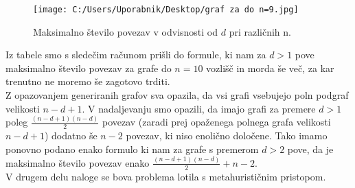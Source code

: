 \documentclass[12pt,a4paper]{amsart}
\theoremstyle{definition} %
\theoremstyle{plain} %
\begin{document}
\begin{figure}[h]
    \centering
    \texttt{[image: C:/Users/Uporabnik/Desktop/graf za do n=9.jpg]}
    \caption{Maksimalno število povezav v odvisnosti od \(d\) pri različnih n.}
    \label{fig:slika1}
\end{figure}

\pagebreak


Iz tabele smo s sledečim računom prišli do formule, ki nam za $d > 1$ pove maksimalno število povezav za
grafe do $n = 10$ vozlišč in morda še več, za kar trenutno ne moremo še zagotovo trditi.\\


Z opazovanjem generiranih grafov sva opazila, da vsi grafi vsebujejo poln podgraf velikosti $n - d + 1$.
V nadaljevanju smo opazili, da imajo grafi za premere $d > 1$ poleg $\frac{(n - d + 1)(n - d)}{2}$ povezav (zaradi
prej opaženega polnega grafa velikosti $n - d + 1$) dodatno še $n - 2$ povezav, ki niso enolično določene.
Tako imamo ponovno podano enako formulo ki nam za grafe s premerom $d > 2$ pove, da je maksimalno število
povezav enako $\frac{(n - d + 1)(n - d)}{2} + n - 2$.\\


V drugem delu naloge se bova problema lotila s metahurističnim pristopom.
\end{document}
